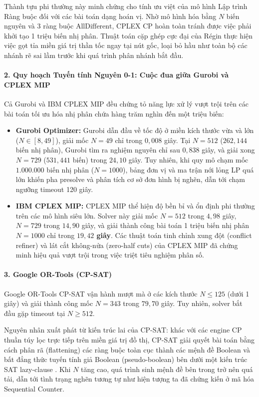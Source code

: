 \documentclass[a4paper,fleqn]{cas-sc}
\begin{document}
Thành tựu phi thường này minh chứng cho tính ưu việt của mô hình Lập trình Ràng buộc đối với các bài toán dạng hoán vị. Nhờ mô hình hóa bằng $N$ biến nguyên và 3 ràng buộc $\text{AllDifferent}$, CPLEX CP hoàn toàn tránh được việc phải khởi tạo 1 triệu biến nhị phân. Thuật toán cặp ghép cực đại của Régin thực hiện việc gọt tỉa miền giá trị thần tốc ngay tại nút gốc, loại bỏ hầu như toàn bộ các nhánh rẽ sai lầm trước khi quá trình phân nhánh bắt đầu.

\paragraph{2. Quy hoạch Tuyến tính Nguyên 0-1: Cuộc đua giữa Gurobi và CPLEX MIP}
Cả Gurobi và IBM CPLEX MIP đều chứng tỏ năng lực xử lý vượt trội trên các bài toán tối ưu hóa nhị phân chứa hàng trăm nghìn đến một triệu biến:
\begin{itemize}
    \item \textbf{Gurobi Optimizer:} Gurobi dẫn đầu về tốc độ ở miền kích thước vừa và lớn ($N \in [8, 49]$), giải mốc $N=49$ chỉ trong $0{,}008$ giây. Tại $N = 512$ ($262{,}144$ biến nhị phân), Gurobi tìm ra nghiệm nguyên chỉ sau $0{,}838$ giây, và giải xong $N = 729$ ($531{,}441$ biến) trong $24{,}10$ giây. Tuy nhiên, khi quy mô chạm mốc $1.000.000$ biến nhị phân ($N=1000$), bảng đơn vị và ma trận nới lỏng LP quá lớn khiến pha presolve và phân tích cơ sở đơn hình bị nghẽn, dẫn tới chạm ngưỡng timeout 120 giây.
    \item \textbf{IBM CPLEX MIP:} CPLEX MIP thể hiện độ bền bỉ và ổn định phi thường trên các mô hình siêu lớn. Solver này giải mốc $N = 512$ trong $4{,}98$ giây, $N = 729$ trong $14{,}90$ giây, và giải thành công bài toán 1 triệu biến nhị phân $N = 1000$ chỉ trong \textbf{$19{,}42$ giây}. Các thuật toán tinh chỉnh xung đột (conflict refiner) và lát cắt không-nửa (zero-half cuts) của CPLEX MIP đã chứng minh hiệu quả vượt trội trong việc triệt tiêu nghiệm phân số.
\end{itemize}

\paragraph{3. Google OR-Tools (CP-SAT)}
Google OR-Tools CP-SAT vận hành mượt mà ở các kích thước $N \le 125$ (dưới 1 giây) và giải thành công mốc $N = 343$ trong $79{,}70$ giây. Tuy nhiên, solver bắt đầu gặp timeout tại $N \ge 512$.

Nguyên nhân xuất phát từ kiến trúc lai của CP-SAT: khác với các engine CP thuần túy lọc trực tiếp trên miền giá trị đồ thị, CP-SAT giải quyết bài toán bằng cách phân rã (flattening) các ràng buộc toàn cục thành các mệnh đề Boolean và bất đẳng thức tuyến tính giả Boolean (pseudo-boolean) bên dưới một kiến trúc SAT lazy-clause \cite{perron2023ortools}. Khi $N$ tăng cao, quá trình sinh mệnh đề bên trong trở nên quá tải, dẫn tới tình trạng nghẽn tương tự như hiện tượng ta đã chứng kiến ở mã hóa Sequential Counter.
\end{document}
